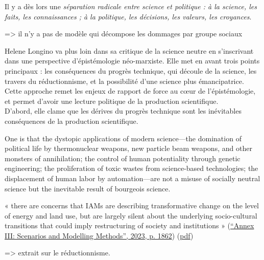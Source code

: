 Il y a dès lors une \emph{séparation radicale entre science et politique : à la science, les faits, les connaissances ; à la politique, les décisions, les valeurs, les croyances}. 






=> il n'y a pas de modèle qui décompose les dommages par groupe sociaux

Helene Longino va plus loin dans sa critique de la science neutre en s'inscrivant dans une perspective d'épistémologie néo-marxiste. Elle met en avant trois points principaux : les conséquences du progrès technique, qui découle de la science, les travers du réductionnisme, et la possibilité d'une science plus émancipatrice. Cette approche remet les enjeux de rapport de force au cœur de l'épistémologie, et permet d'avoir une lecture politique de la production scientifique. \\

D'abord, elle clame que les dérives du progrès technique sont les inévitables conséquences de la production scientifique. 

\begin{displayquote}
    One is that the dystopic applications of modern science—the domination of political life by thermonuclear weapons, new particle beam weapons, and other monsters of annihilation; the control of human potentiality through genetic engineering; the proliferation of toxic wastes from science-based technologies; the displacement of human labor by automation—are not a misuse of socially neutral science but the inevitable result of bourgeois science.
\end{displayquote}

« there are concerns that IAMs are describing transformative change on the level of energy and land use, but are largely silent about the underlying socio-cultural transitions that could imply restructuring of society and institutions » (\href{zotero://select/library/items/2SDDNUUF}{“Annex III: Scenarios and Modelling Methods”, 2023, p. 1862}) (\href{zotero://open-pdf/library/items/CHVFSLLH?page=22&annotation=JY4VBIZY}{pdf})



=> extrait sur le réductionnisme.


